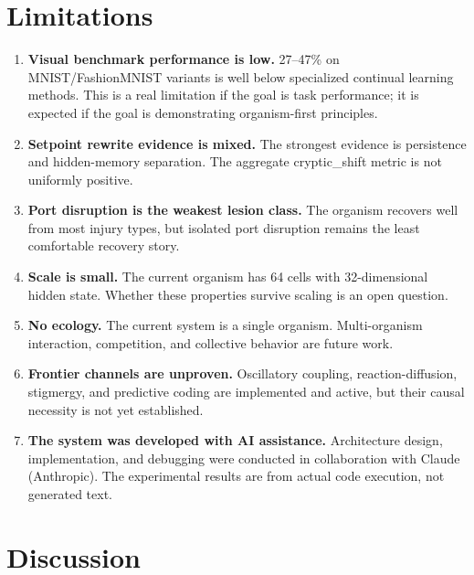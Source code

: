 \documentclass[11pt,a4paper]{article}
\begin{document}
\section{Limitations}
\begin{enumerate}[leftmargin=*,itemsep=4pt]
\item \textbf{Visual benchmark performance is low.} 27--47\% on MNIST/FashionMNIST variants is well below specialized continual learning methods. This is a real limitation if the goal is task performance; it is expected if the goal is demonstrating organism-first principles.
\item \textbf{Setpoint rewrite evidence is mixed.} The strongest evidence is persistence and hidden-memory separation. The aggregate cryptic\_shift metric is not uniformly positive.
\item \textbf{Port disruption is the weakest lesion class.} The organism recovers well from most injury types, but isolated port disruption remains the least comfortable recovery story.
\item \textbf{Scale is small.} The current organism has 64 cells with 32-dimensional hidden state. Whether these properties survive scaling is an open question.
\item \textbf{No ecology.} The current system is a single organism. Multi-organism interaction, competition, and collective behavior are future work.
\item \textbf{Frontier channels are unproven.} Oscillatory coupling, reaction-diffusion, stigmergy, and predictive coding are implemented and active, but their causal necessity is not yet established.
\item \textbf{The system was developed with AI assistance.} Architecture design, implementation, and debugging were conducted in collaboration with Claude (Anthropic). The experimental results are from actual code execution, not generated text.
\end{enumerate}

\section{Discussion}
\end{document}
